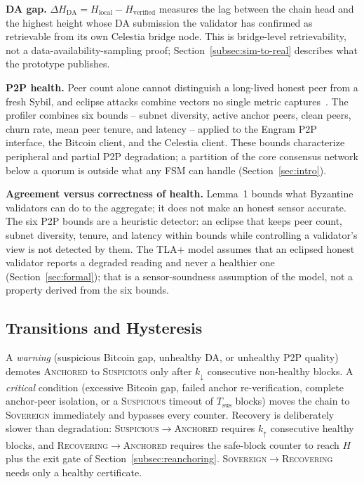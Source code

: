 \textbf{DA gap.} $\Delta H_{\text{DA}} = H_{\text{local}} -
H_{\text{verified}}$ measures the lag between the chain head and the highest
height whose DA submission the validator has confirmed as retrievable from
its own Celestia bridge node. This is bridge-level retrievability, not a
data-availability-sampling proof; Section~\ref{subsec:sim-to-real} describes
what the prototype publishes.

\textbf{P2P health.} Peer count alone cannot distinguish a long-lived honest
peer from a fresh Sybil, and eclipse attacks combine vectors no single
metric captures~\cite{rehman2025eclipse,heilman2015eclipse}. The profiler
combines six bounds -- subnet diversity, active anchor peers, clean peers,
churn rate, mean peer tenure, and latency -- applied to the Engram P2P
interface, the Bitcoin client, and the Celestia client. These bounds
characterize peripheral and partial P2P degradation; a partition of the
core consensus network below a quorum is outside what any FSM can handle
(Section~\ref{sec:intro}).

\textbf{Agreement versus correctness of health.} Lemma~1 bounds what
Byzantine validators can do to the aggregate; it does not make an honest
sensor accurate. The six P2P bounds are a heuristic detector: an eclipse that
keeps peer count, subnet diversity, tenure, and latency within bounds while
controlling a validator's view is not detected by them. The TLA+ model assumes
that an eclipsed honest validator reports a degraded reading and never a
healthier one
(Section~\ref{sec:formal}); that is a sensor-soundness assumption of the
model, not a property derived from the six bounds.

\subsection{Transitions and Hysteresis}
\label{subsec:transitions}

A \emph{warning} (suspicious Bitcoin gap, unhealthy DA, or unhealthy P2P
quality) demotes \textsc{Anchored} to \textsc{Suspicious} only after
$k_{\downarrow}$ consecutive non-healthy blocks. A \emph{critical} condition
(excessive Bitcoin gap, failed anchor re-verification, complete anchor-peer
isolation, or a \textsc{Suspicious} timeout of $T_{\text{sus}}$ blocks) moves
the chain to \textsc{Sovereign} immediately and bypasses every counter.
Recovery is deliberately slower than degradation:
\textsc{Suspicious}$\to$\textsc{Anchored} requires $k_{\uparrow}$ consecutive
healthy blocks, and \textsc{Recovering}$\to$\textsc{Anchored} requires the
safe-block counter to reach $H$ plus the exit gate of
Section~\ref{subsec:reanchoring}. \textsc{Sovereign}$\to$\textsc{Recovering}
needs only a healthy certificate.

